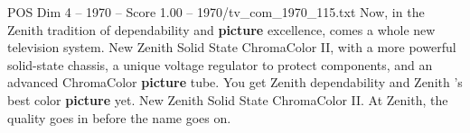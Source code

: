 \begin{textsample}{POS Dim 4 – 1970 – Score 1.00 – 1970/tv\_com\_1970\_115.txt}  \label{ex:f4_pos_038}
Now, in the Zenith tradition of dependability and \textbf{picture} excellence, comes a whole new television system.
New Zenith Solid State ChromaColor II, with a more powerful solid-state chassis, a unique voltage regulator to protect components, and an advanced ChromaColor \textbf{picture} tube.
You get Zenith dependability and Zenith 's best color \textbf{picture} yet.
New Zenith Solid State ChromaColor II.
At Zenith, the quality goes in before the name goes on.

\end{textsample}
